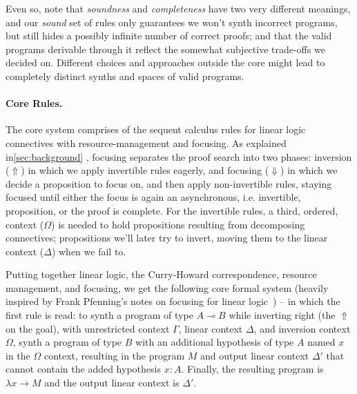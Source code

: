 \documentclass{llncs}
\newcommand{\lolli}{\multimap}
\newcommand{\mypara}[1]{\paragraph{\textbf{#1}.}}
\begin{document}
Even so, note that \emph{soundness} and \emph{completeness} have two very
different meanings, and our \emph{sound} set of rules only guarantees we won't
synth incorrect programs, but still hides a possibly infinite number of correct
proofs; and that the valid programs derivable through it reflect the somewhat
subjective trade-offs we decided on. Different choices and approaches outside
the core might lead to completely distinct synths and spaces of valid programs.


\mypara{Core Rules} The core system comprises of the sequent calculus rules for
linear logic connectives with resource-management and focusing. As
explained in\ref{sec:background} , focusing separates the proof search into two
phases: inversion ($\Uparrow$) in which we apply invertible rules eagerly, and
focusing ($\Downarrow$) in which we decide a proposition to focus on, and then
apply non-invertible rules, staying focused until either the focus is again an
asynchronous, i.e. invertible, proposition, or the proof is complete.  For the
invertible rules, a third, ordered, context ($\Omega$) is needed to hold
propositions resulting from decomposing connectives; propositions we'll later try to
invert, moving them to the linear context ($\Delta$) when we fail to.


Putting together linear logic, the Curry-Howard correspondence, resource
management, and focusing, we get the following core formal system (heavily inspired
by Frank Pfenning's notes on focusing for linear logic~\cite{FPnotes...}) -- in which the
first rule is read: to synth a program of type $A \lolli B$ while inverting
right (the $\Uparrow$ on the goal), with unrestricted context $\Gamma$, linear
context $\Delta$, and inversion context $\Omega$, synth a program of type $B$ with
an additional hypothesis of type $A$ named $x$ in the $\Omega$ context,
resulting in the program $M$ and output linear
context $\Delta'$ that cannot contain the added hypothesis $x{:}A$. Finally, the
resulting program is $\lambda x \rightarrow M$ and the output linear context is
$\Delta'$.
\end{document}
